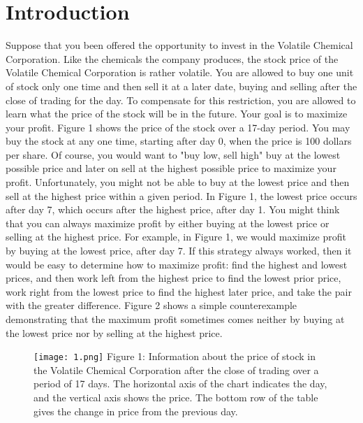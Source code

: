 \section{Introduction}

Suppose that you been offered the opportunity to invest in the Volatile Chemical Corporation. Like the chemicals the company produces, the stock price of the Volatile Chemical Corporation is rather volatile. You are allowed to buy one unit of stock only one time and then sell it at a later date, buying and selling after the close of trading for the day. To compensate for this restriction, you are allowed to learn what the price of the stock will be in the future. Your goal is to maximize your profit. Figure 1 shows the price of the stock over a 17-day period. You may buy the stock at any one time, starting after day 0, when the price is 100 dollars per share. Of course, you would want to "buy low, sell high" buy at the lowest possible price and later on sell at the highest possible price to maximize your profit. Unfortunately, you might not be able to buy at the lowest price and then sell at the highest price within a given period. In Figure 1, the lowest price occurs after day 7, which occurs after the highest price, after day 1.
You might think that you can always maximize profit by either buying at the lowest price or selling at the highest price. For example, in Figure 1, we would maximize profit by buying at the lowest price, after day 7. If this strategy always worked, then it would be easy to determine how to maximize profit: find the highest and lowest prices, and then work left from the highest price to find the lowest prior price, work right from the lowest price to find the highest later price, and take the pair with the greater difference. Figure 2 shows a simple counterexample demonstrating that the maximum profit sometimes comes neither by buying at the lowest price nor by selling at the highest price. \hfill \break

\begin{figure}[H]
\texttt{[image: 1.png]}
\centering \linebreak \linebreak Figure 1: {\small Information about the price of stock in the Volatile Chemical Corporation after the close of trading over a period of 17 days. The horizontal axis of the chart indicates the day, and the vertical axis shows the price. The bottom row of the table gives the change in price from the previous day.}
\end{figure}

